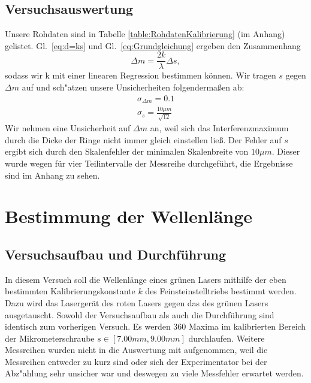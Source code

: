 \documentclass[12pt,a4paper]{article}
\begin{document}
\subsection{Versuchsauswertung}
Unsere Rohdaten sind in Tabelle \ref{table:RohdatenKalibrierung} (im Anhang) gelistet.
Gl.~\eqref{eq:d=ks} und Gl.~\eqref{eq:Grundgleichung} ergeben den Zusammenhang
\begin{equation}
\Delta m = \frac{2k}{\lambda}\Delta s,
\end{equation}
sodass wir k mit einer linearen Regression bestimmen können. Wir tragen $s$ gegen $\Delta m$ auf und sch"atzen unsere Unsicherheiten folgendermaßen ab:
\begin{align}\label{eq:Unsicherheit_Kalibrierung}
\sigma_{\Delta m}=0.1\\
\sigma_s=\frac{10\mu m}{\sqrt{12}}
\end{align}
Wir nehmen eine Unsicherheit auf $\Delta m$ an, weil sich das Interferenzmaximum durch die Dicke der Ringe nicht immer gleich einstellen lie\ss. Der Fehler auf $s$ ergibt sich durch den Skalenfehler der minimalen Skalenbreite von $10\mu m$. Dieser wurde wegen für vier Teilintervalle der Messreihe durchgeführt, die Ergebnisse sind im Anhang zu sehen.

\section{Bestimmung der Wellenlänge}
\subsection{Versuchsaufbau und Durchführung}
In diesem Versuch soll die Wellenlänge eines grünen Lasers mithilfe der eben bestimmten Kalibrierungskonstante $k$ des Feinsteinstelltriebs bestimmt werden. Dazu wird das Lasergerät des roten Lasers gegen das des grünen Lasers ausgetauscht. Sowohl der Versuchsaufbau als auch die Durchführung sind identisch zum vorherigen Versuch. Es werden 360 Maxima im kalibrierten Bereich der Mikrometerschraube $s\in[7.00mm,9.00mm]$ durchlaufen.
Weitere Messreihen wurden nicht in die Auswertung mit aufgenommen, weil die Messreihen entweder zu kurz sind oder sich der Experimentator bei der Abz"ahlung sehr unsicher war und deswegen zu viele Messfehler erwartet werden.
\end{document}
